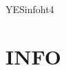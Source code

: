 %

\ifx \HTML\UnDef
   \def\HTML{infoht4}
   \def\CONFIG{\jobname}
   \def\MAKETITLE{\author{Eitan M. Gurari}}
   \def\next{   \endinput}
   \expandafter\next
\fi





\expandafter\ifx \csname YES\HTML\endcsname\relax
\else
    \def\CleanComment#1tex4ht-info-html4#2#3#4.#5>#6//{[#4%
                  \if,\ifnum \FIRST=#6 .\else ,0\fi\fi]#6//}
\fi
\chapter{INFO}


